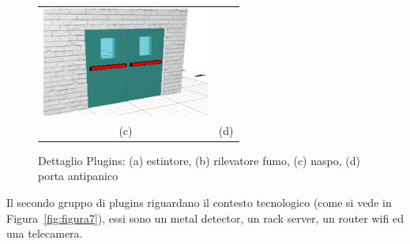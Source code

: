 \begin{figure}[htbp]
\begin{center}
\begin{tabular}{c @{\hspace{1em}} c}
\includegraphics[width=5.5cm]{images/panicDoorDouble} \\
 (c) & (d) \\
\end{tabular}
\end{center}
\caption{Dettaglio Plugins: (a) estintore, (b) rilevatore fumo, (c) naspo, (d) porta antipanico}\label{fig:figura6}
\end{figure}
\newpage

Il secondo gruppo di plugins riguardano il contesto tecnologico (come si vede in Figura~\ref{fig:figura7}), essi sono
un metal detector, un rack server, un router wifi ed una telecamera.
